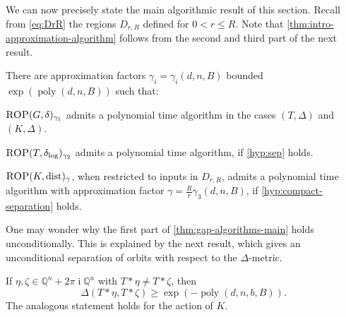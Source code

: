\documentclass[a4paper,USenglish,cleveref,numberwithinsect]{lipics-v2021}
\DeclareMathOperator{\poly}{poly}
\DeclareMathOperator{\ii}{i}
\DeclareMathOperator{\dist}{dist}
\newcommand{\distLD}{\delta_{\log}}
\newcommand{\QQ}{\mathbb{Q}}
\numberwithin{equation}{section}
\begin{document}
We can now precisely state the main algorithmic result of this section.
Recall from \cref{eq:DrR} the regions $D_{r, R}$ defined for $0<r\leq R$.
Note that \cref{thm:intro-approximation-algorithm} follows from
the second and third part of the next result.

\begin{theorem}
\label{thm:gap-algorithms-main}
There are approximation factors $\gamma_i=\gamma_i(d,n,B)$
bounded $\exp(\poly(d,n,B))$ such that:
\begin{alphaenumerate}
\item\label{it:gap 3}
$\textsc{ROP}(G,\delta)_{\gamma_1}$ admits a polynomial time algorithm
in the cases $(T, \Delta)$ and $(K, \Delta)$.

\item\label{it:gap 1}
$\textsc{ROP}(T,\distLD)_{\gamma_2}$
admits a polynomial time algorithm,
if \cref{hyp:sep} holds.

\item\label{it:gap 2}
$\textsc{ROP}(K,\dist)_{\gamma}$, when restricted to inputs in $D_{r,R}$,
admits a polynomial time algorithm with
approximation factor $\gamma= \frac{R}{r}\gamma_3(d,n,B)$,
if \cref{hyp:compact-separation} holds.

\end{alphaenumerate}
\end{theorem}

One may wonder why the first part of \cref{thm:gap-algorithms-main}
holds unconditionally. This is explained by the next result, which
gives an unconditional separation of orbits with respect to
the $\Delta$-metric.

\begin{proposition}
\label{prop:logarithmic-separation}
If $\eta,\zeta\in\QQ^n+2\pi\ii\QQ^n$ with
$T\ast\eta\neq T\ast\zeta$, then
\[
 \Delta(T\ast\eta, T\ast\zeta) \ge \exp(-\poly(d,n,b,B)) .
\]
The analogous statement holds for the action of $K$.
\end{proposition}
\end{document}
